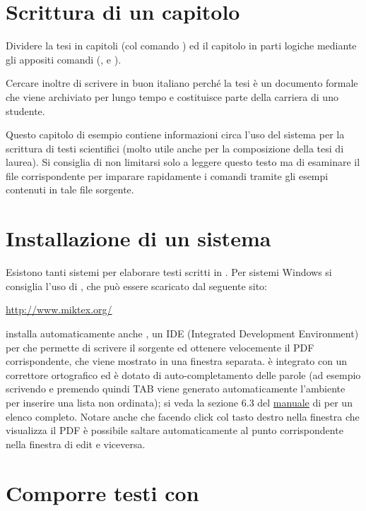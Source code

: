 \section{Scrittura di un capitolo}

Dividere la tesi in capitoli (col comando ) ed il capitolo in parti logiche mediante gli appositi comandi (,  e ).

Cercare inoltre di scrivere in  buon italiano perché la tesi è un documento formale che viene archiviato per lungo tempo e costituisce parte della carriera di uno studente.

Questo capitolo di esempio contiene informazioni circa l'uso del sistema \ltx per la scrittura di testi scientifici (molto utile anche per la composizione della tesi di laurea).
Si consiglia di non limitarsi solo a leggere questo testo ma di esaminare il file   corrispondente per imparare rapidamente i comandi \ltx tramite gli esempi contenuti in tale file sorgente.

\section{Installazione di un sistema \ltx}

Esistono tanti sistemi per elaborare testi scritti in \ltx. Per sistemi Windows si consiglia l'uso di \mik, che può essere scaricato dal seguente sito:

\url{http://www.miktex.org/}

\mik installa automaticamente anche \txw, un IDE (Integrated Development Environment) per \ltx che permette di scrivere il sorgente ed ottenere velocemente il PDF corrispondente, che viene mostrato in una finestra separata. \txw è integrato con un correttore ortografico ed è dotato di auto-completamento delle parole (ad esempio scrivendo  e premendo quindi TAB viene generato automaticamente l'ambiente  per inserire una lista non ordinata); si veda la sezione 6.3 del \href{http://www.leliseron.org/texworks/}{manuale} di \txw per un elenco completo.
Notare anche che facendo click col tasto destro nella finestra che visualizza il PDF è possibile saltare automaticamente al punto corrispondente nella finestra di edit e viceversa.


\section{Comporre testi con \ltx}

